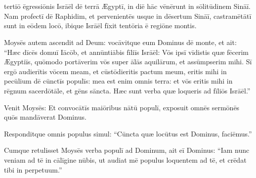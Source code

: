 \chapter{}


\thispagestyle{empty}

 tertiō ēgressiōnis Isrāēl dē
terrā Ægyptī, in diē hāc vēnērunt in sōlitūdinem Sināī. 
Nam profectī dē Raphidim, et pervenientēs usque in dēsertum Sināī,
castramētātī sunt in eōdem locō, ibique
Isrāēl fīxit tentōria ē regiōne montis. 

Moysēs autem ascendit ad Deum: vocāvitque eum Dominus dē
monte, et ait: ``Hæc dīcēs domuī Iācōb, et
annūntiābis fīliīs Isrāēl: 
Vōs ipsī vīdistis quæ fēcerim
Ægyptiīs, quōmodo portāverim vōs super ālās aquilārum, et assūmpserim mihi.
Sī ergō audierītis vōcem meam, et cūstōdieritis pactum meum, eritis mihi in pecūlium dē
cūnctīs populīs: mea est enim omnis terra: 
et vōs eritis mihi in
rēgnum sacerdōtāle, et gēns
sāncta. Hæc sunt verba quæ loqueris ad fīliōs
Isrāēl.''

Venit Moysēs: Et convocātīs maiōribus nātū populī, exposuit
omnēs sermōnēs quōs mandāverat Dominus. 

Responditque omnis populus simul: ``Cūn\-cta quæ
locūtus est Dominus, faciēmus.''

Cumque retulisset Moysēs verba populī ad
Dominum, ait eī Dominus: ``Iam nunc veniam ad tē in
cālīgine nūbis, ut audiat mē populus loquentem ad tē, et
crēdat tibi in perpetuum.''


